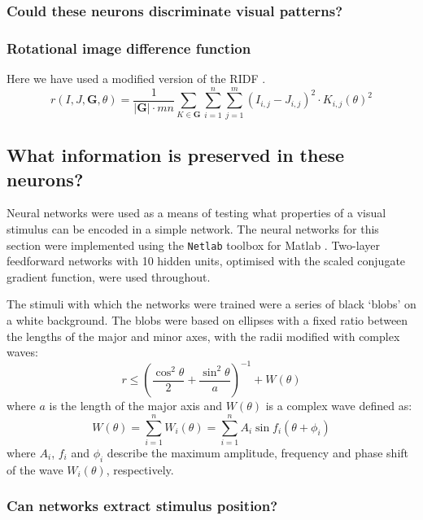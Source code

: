 \subsubsection{Could these neurons discriminate visual patterns?}

\subsubsection{Rotational image difference function}
Here we have used a modified version of the \ac{RIDF} \cite{Philippides2011,Zeil2003}.
$$
r(I,J,\bm{G},\theta) = \frac{1}{|\bm{G}|\cdot mn} {\sum\limits_{K \in \bm{G}} \sum\limits^n_{i=1} \sum\limits^m_{j=1} (I_{i,j}-J_{i,j})^2 \cdot {K_{i,j}}(\theta)^2}
$$



\subsection{What information is preserved in these neurons?}
Neural networks were used as a means of testing what properties of a visual stimulus can be encoded in a simple network.
The neural networks for this section were implemented using the \texttt{Netlab} toolbox for Matlab \cite{netlab}.
Two-layer feedforward networks with 10 hidden units, optimised with the scaled conjugate gradient function, were used throughout.

The stimuli with which the networks were trained were a series of black `blobs' on a white background.
The blobs were based on ellipses with a fixed ratio between the lengths of the major and minor axes, with the radii modified with complex waves:
$$
r \le \left(\frac{\cos^2 \theta}{2} + \frac{\sin^2 \theta}{a} \right)^{-1} + W(\theta)
$$
where $a$ is the length of the major axis and $W(\theta)$ is a complex wave defined as:
$$
W(\theta) = \sum_{i=1}^n W_i(\theta) = \sum_{i=1}^n A_i \sin f_i (\theta+\phi_i) 
$$
where $A_i$, $f_i$ and $\phi_i$ describe the maximum amplitude, frequency and phase shift of the wave $W_i(\theta)$, respectively.

\subsubsection{Can networks extract stimulus position?}






